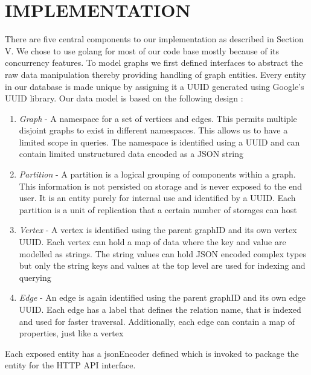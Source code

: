 \documentclass[letterpaper, 11 pt, conference]{ieeeconf}  %
\begin{document}
\section{IMPLEMENTATION}
There are five central components to our implementation as described in Section V. We chose to use golang\cite{golang} for most of our code base mostly because of its concurrency features. To model graphs we first defined interfaces to abstract the raw data manipulation thereby providing handling of graph entities. Every entity in our database is made unique by assigning it a UUID generated using Google's UUID library. Our data model is based on the following design :
\begin{enumerate}
\item \textit{Graph} - A namespace for a set of vertices and edges. This permits multiple disjoint graphs to exist in different namespaces. This allows us to have a limited scope in queries. The namespace is identified using a UUID and can contain limited unstructured data encoded as a JSON string

\item \textit{Partition} - A partition is a logical grouping of components within a graph. This information is not persisted on storage and is never exposed to the end user. It is an entity purely for internal use and identified by a UUID. Each partition is a unit of replication that a certain number of storages can host 

\item \textit{Vertex} - A vertex is identified using the parent graphID and its own vertex UUID. Each vertex can hold a map of data where the key and value are modelled as strings. The string values can hold JSON encoded complex types but only the string keys and values at the top level are used for indexing and querying

\item \textit{Edge} - An edge is again identified using the parent graphID and its own edge UUID. Each edge has a label that defines the relation name, that is indexed and used for faster traversal. Additionally, each edge can contain a map of properties, just like a vertex
\end{enumerate}
Each exposed entity has a jsonEncoder defined which is invoked to package the entity for the HTTP API interface.
\end{document}
